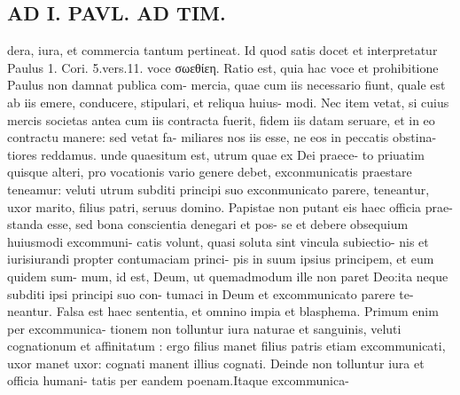 \documentclass{article}
\begin{document}
\begin{pages}
\section*{AD I. PAVL. AD TIM. }
\marginpar{[ p.400 ]}dera, iura, et commercia tantum pertineat. Id quod satis docet et interpretatur Paulus 1. Cori. 5.vers.11. voce σωεθίεη. Ratio est, quia hac voce et prohibitione Paulus non damnat publica com- mercia, quae cum iis necessario fiunt, quale est ab iis emere, conducere, stipulari, et reliqua huius- modi. Nec item vetat, si cuius mercis societas antea cum iis contracta fuerit, fidem iis datam seruare, et in eo contractu manere: sed vetat fa- miliares nos iis esse, ne eos in peccatis obstina- tiores reddamus. unde quaesitum est, utrum quae ex Dei praece- to priuatim quisque alteri, pro vocationis vario genere debet, exconmunicatis praestare teneamur: veluti utrum subditi principi suo exconmunicato parere, teneantur, uxor marito, filius patri, seruus domino. Papistae non putant eis haec officia prae- standa esse, sed bona conscientia denegari et pos- se et debere obsequium huiusmodi excommuni- catis volunt, quasi soluta sint vincula subiectio- nis et iurisiurandi propter contumaciam princi- pis in suum ipsius principem, et eum quidem sum- mum, id est, Deum, ut quemadmodum ille non paret Deo:ita neque subditi ipsi principi suo con- tumaci in Deum et excommunicato parere te- neantur. Falsa est haec sententia, et omnino impia et blasphema. Primum enim per excommunica- tionem non tolluntur iura naturae et sanguinis, veluti cognationum et affinitatum : ergo filius manet filius patris etiam excommunicati, uxor manet uxor: cognati manent illius cognati. Deinde non tolluntur iura et officia humani- tatis per eandem poenam.Itaque excommunica- 

\end{pages}
\end{document}
